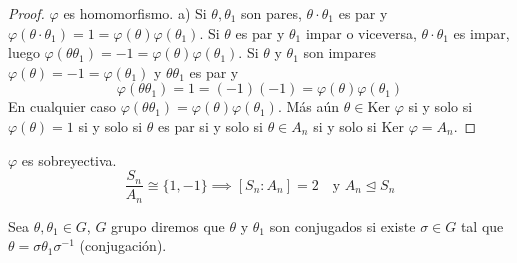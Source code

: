 \begin{proof}
    $\varphi$ es homomorfismo.
    a) Si $\theta, \theta_1$ son pares, $\theta \cdot \theta_1$ es par y $\varphi(\theta \cdot \theta_1) = 1 = \varphi(\theta)\varphi(\theta_1)$.
    Si $\theta$ es par y $\theta_1$ impar o viceversa, $\theta \cdot \theta_1$ es impar, luego $\varphi(\theta \theta_1) = -1 = \varphi(\theta)\varphi(\theta_1)$.
    Si $\theta$ y $\theta_1$ son impares $\varphi(\theta) = -1 = \varphi(\theta_1)$ y $\theta \theta_1$ es par y
    \begin{equation*}
        \varphi(\theta \theta_1) = 1 = (-1)(-1) = \varphi(\theta)\varphi(\theta_1)
    \end{equation*}
    En cualquier caso $\varphi(\theta \theta_1) = \varphi(\theta)\varphi(\theta_1)$. Más aún $\theta \in \text{Ker } \varphi$ si y solo si $\varphi(\theta) = 1$ si y solo si $\theta$ es par si y solo si $\theta \in A_n$ si y solo si $\text{Ker } \varphi = A_n$.
\end{proof}

\begin{nota}
    $\varphi$ es sobreyectiva.
    \begin{equation*}
        \frac{S_n}{A_n} \cong \{1, -1\} \implies [S_n : A_n] = 2 \quad \text{y } A_n \trianglelefteq S_n
    \end{equation*}
\end{nota}

\begin{defi}
    Sea $\theta, \theta_1 \in G$, $G$ grupo diremos que $\theta$ y $\theta_1$ son conjugados si existe $\sigma \in G$ tal que $\theta = \sigma \theta_1 \sigma^{-1}$ (conjugación).
\end{defi}

